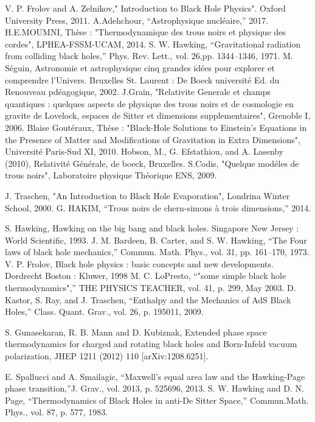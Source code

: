 \documentclass[12pt,  a4paper, openright]{report} %
\begin{document}
\begin{thebibliography}{99}
	  V. P. Frolov and A. Zelnikov," Introduction to Black Hole Physics". Oxford University Press, 2011.
  A.Adehchour, “Astrophysique nucléaire,” 2017.
  H.E.MOUMNI, Thèse : "Thermodynamique des trous noirs et physique des
cordes", LPHEA-FSSM-UCAM, 2014.
  S. W. Hawking, “Gravitational radiation from colliding black holes,” Phys. Rev. Lett., vol. 26,pp. 1344–1346, 1971.
 M. Séguin, Astronomie et astrophysique cinq grandes idées pour explorer et comprendre l’Univers. Bruxelles St. Laurent : De Boeck université Ed. du Renouveau pdéagogique, 2002.
 J.Grain, "Relativite Generale et champs quantiques : quelques aspects de physique
des trous noirs et de cosmologie en gravite de Lovelock, espaces de Sitter et
dimensions supplementaires", Grenoble I, 2006.
 Blaise Goutéraux, Thèse : "Black-Hole Solutions to Einstein’s Equations in the
 Presence of Matter and Modifications of Gravitation in Extra Dimensions", Université Paris-Sud XI, 2010.
  Hobson, M., G. Efstathiou, and A. Lasenby (2010), Relativité Générale, de boeck,
Bruxelles.
  S.Codis, "Quelque modéles de trous noirs", Laboratoire physique Théorique ENS,
2009.

  J. Traschen, "An Introduction to Black Hole Evaporation", Londrina Winter
School, 2000.
  G. HAKIM, “Trous noirs de chern-simons à trois dimensions,” 2014.

  S. Hawking, Hawking on the big bang and black holes. Singapore New Jersey : World Scientific, 1993.
 J. M. Bardeen, B. Carter, and S. W. Hawking, “The Four laws of black hole mechanics,” Commun. Math. Phys., vol. 31, pp. 161–170, 1973.
 V. P. Frolov, Black hole physics : basic concepts and new developments. Dordrecht Boston : Kluwer,
1998
  M. C. LoPresto, “"some simple black hole thermodynamics",” THE PHYSICS TEACHER, vol. 41,
p. 299, May 2003.
  D. Kastor, S. Ray, and J. Traschen, “Enthalpy and the Mechanics of AdS Black Holes,” Class. Quant.
Grav., vol. 26, p. 195011, 2009.

 S. Gunasekaran, R. B. Mann and D. Kubiznak, Extended phase space thermodynamics for charged and
rotating black holes and Born-Infeld vacuum polarization, JHEP 1211 (2012) 110 [arXiv:1208.6251].

 E. Spallucci and A. Smailagic, “Maxwell’s equal area law and the Hawking-Page phase transition,”J. Grav., vol. 2013, p. 525696, 2013.
  S. W. Hawking and D. N. Page, “Thermodynamics of Black Holes in anti-De Sitter Space,” Commun.Math. Phys., vol. 87, p. 577, 1983.


\end{thebibliography}
\end{document}
